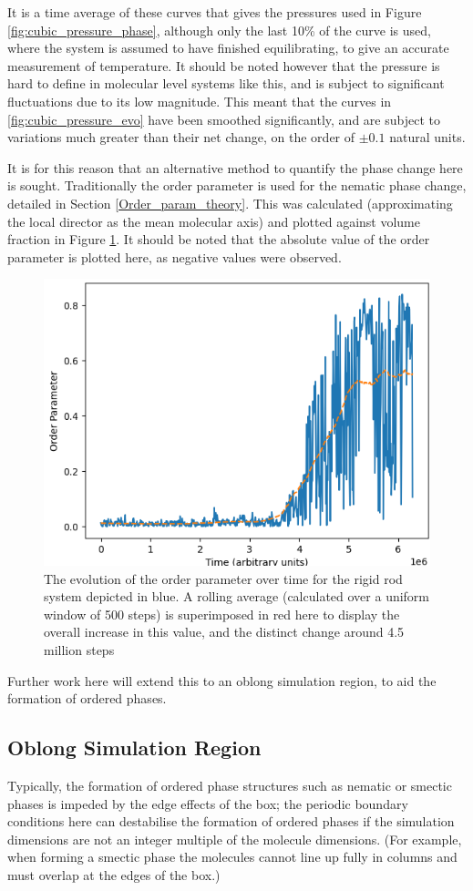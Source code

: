 \documentclass[11pt, a4paper]{article} %
\begin{document}
It is a time average of these curves that gives the pressures used in Figure \ref{fig:cubic_pressure_phase}, although only the last 10\% of the curve is used, where the system is assumed to have finished equilibrating, to give an accurate measurement of temperature. It should be noted however that the pressure is hard to define in molecular level systems like this, and is subject to significant fluctuations due to its low magnitude. This meant that the curves in \ref{fig:cubic_pressure_evo} have been smoothed significantly, and are subject to variations much greater than their net change, on the order of $\pm 0.1$ natural units.

It is for this reason that an alternative method to quantify the phase change here is sought. Traditionally the order parameter is used for the nematic phase change, detailed in Section \ref{Order_param_theory}. This was calculated (approximating the local director as the mean molecular axis) and plotted against volume fraction in Figure \ref{fig:cubic_order}. It should be noted that the absolute value of the order parameter is plotted here, as negative values were observed.

\begin{figure}
	\centering
	\includegraphics[width=0.7\linewidth]{Figures/director_evo_cubic}
	\caption{The evolution of the order parameter over time for the rigid rod system depicted in blue. A rolling average (calculated over a uniform window of 500 steps) is superimposed in red here to display the overall increase in this value, and the distinct change around 4.5 million steps}
	\label{fig:cubic_order}
\end{figure}

Further work here will extend this to an oblong simulation region, to aid the formation of ordered phases.

\subsection{Oblong Simulation Region}
Typically, the formation of ordered phase structures such as nematic or smectic phases is impeded by the edge effects of the box; the periodic boundary conditions here can destabilise the formation of ordered phases if the simulation dimensions are not an integer multiple of the molecule dimensions. (For example, when forming a smectic phase the molecules cannot line up fully in columns and must overlap at the edges of the box.)
\end{document}
